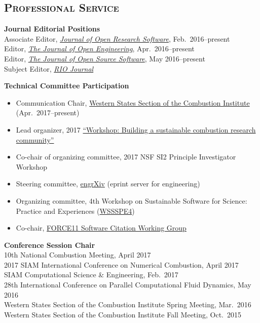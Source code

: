 \documentclass[margin,line,11pt]{res}
\begin{document}
\begin{resume}
\section{\textsc{Professional Service}}

\textbf{Journal Editorial Positions} \\
Associate Editor, \href{http://openresearchsoftware.metajnl.com}{\emph{Journal of Open Research Software}}, Feb.\ 2016--present \\
Editor, \href{http://www.tjoe.org}{\emph{The Journal of Open Engineering}}, Apr.\ 2016--present \\
Editor, \href{http://joss.theoj.org}{\emph{The Journal of Open Source Software}}, May 2016--present \\
Subject Editor, \href{http://riojournal.com}{\emph{RIO Journal}}

\textbf{Technical Committee Participation}
\begin{itemize}[leftmargin=*]
\item Communication Chair, \href{http://wssci.us/}{Western States Section of the Combustion Institute} (Apr.~2017--present)
\item Lead organizer, 2017 \href{https://combustion-community-workshop-2017.github.io/}{``Workshop: Building a sustainable combustion research community''}
\item Co-chair of organizing committee, 2017 NSF SI2 Principle Investigator Workshop
\item Steering committee, \href{http://blog.engrxiv.org/}{engrXiv} (eprint server for engineering)
\item Organizing committee, 4th Workshop on Sustainable Software for Science: Practice and Experiences (\href{http://wssspe.researchcomputing.org.uk/wssspe4/}{WSSSPE4})
\item Co-chair, \href{https://www.force11.org/group/software-citation-working-group}{FORCE11 Software Citation Working Group}
\end{itemize}

\textbf{Conference Session Chair} \\
10th National Combustion Meeting, April 2017 \\
2017 SIAM International Conference on Numerical Combustion, April 2017 \\
SIAM Computational Science \& Engineering, Feb.\ 2017 \\
28th International Conference on Parallel Computational Fluid Dynamics, May 2016 \\
Western States Section of the Combustion Institute Spring Meeting, Mar.\ 2016 \\
Western States Section of the Combustion Institute Fall Meeting, Oct.\ 2015


\end{resume}
\end{document}

